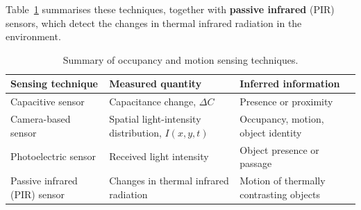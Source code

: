 \documentclass[letterpaper,11pt,leqno]{book}
\begin{document}
Table~\ref{tab:occupancy_summary} summarises these techniques, together with \textbf{passive infrared} (PIR) sensors, which detect the changes in thermal infrared radiation in the environment.

\begin{table}[!htbp]
\centering
\caption{Summary of occupancy and motion sensing techniques.}
\label{tab:occupancy_summary}
\begin{tabular*}{\textwidth}{p{3.6cm}@{\extracolsep\fill}p{5cm}p{5cm}}
\toprule
Sensing technique & Measured quantity & Inferred information \\
\midrule
Capacitive sensor & Capacitance change, $\Delta C$ & Presence or proximity \\
Camera-based sensor & Spatial light-intensity distribution, $I(x,y,t)$ & Occupancy, motion, object identity \\
Photoelectric sensor & Received light intensity & Object presence or passage \\
Passive infrared (PIR) sensor & Changes in thermal infrared radiation & Motion of thermally contrasting objects \\
\bottomrule
\end{tabular*}
\end{table}

\appendix

\end{document}
